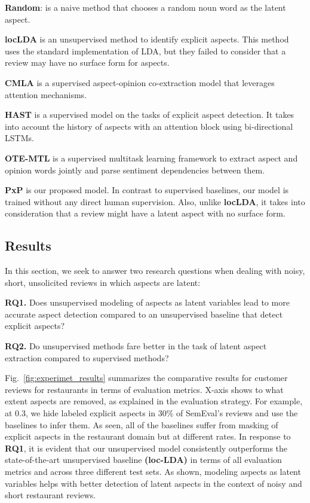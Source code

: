 \documentclass[11pt]{article}
\begin{document}
\noindent\textbf{Random}: is a naive method that chooses a random noun word as the latent aspect.

\noindent\textbf{locLDA} \cite{Brody_2010} is an unsupervised method to identify explicit aspects. This method uses the standard implementation of LDA, but they failed to consider that a review may have no surface form for aspects.

\noindent\textbf{CMLA} \cite{Wang_2017} is a supervised aspect-opinion co-extraction model that leverages attention mechanisms. 

\noindent\textbf{HAST} \cite{LiBLLY18} is a supervised model on the tasks of explicit aspect detection. It takes into account the history of aspects with an attention block using bi-directional LSTMs.

\noindent\textbf{OTE-MTL} \cite{Zhang_2020} is a supervised multitask learning framework to extract aspect and opinion words jointly and parse sentiment dependencies between them. 

\noindent\textbf{PxP} is our proposed model. In contrast to supervised baselines, our model is trained without any direct human supervision. Also, unlike \textbf{locLDA}, it takes into consideration that a review might have a latent aspect with no surface form. 

\subsection{Results}
In this section, we seek to answer two research questions when dealing with noisy, short, unsolicited reviews in which aspects are latent:

\noindent\textbf{RQ1.} Does unsupervised modeling of aspects as latent variables lead to more accurate aspect detection compared to an unsupervised baseline that detect explicit aspects? 

\noindent\textbf{RQ2.} Do unsupervised methods fare better in the task of latent aspect extraction compared to supervised methods?

Fig.~\ref{fig:experimet_results} summarizes the comparative results for customer reviews for restaurants in terms of evaluation metrics. X-axis shows to what extent aspects are removed, as explained in the evaluation strategy. For example, at 0.3, we hide labeled explicit aspects in 30\% of SemEval's reviews and use the baselines to infer them. As seen, all of the baselines suffer from masking of explicit aspects in the restaurant domain but at different rates. In response to \textbf{RQ1}, it is evident that our unsupervised model consistently outperforms the state-of-the-art unsupervised baseline \textbf{(loc-LDA)} in terms of all evaluation metrics and across three different test sets. As shown, modeling aspects as latent variables helps with better detection of latent aspects in the context of noisy and short restaurant reviews. 
\end{document}
